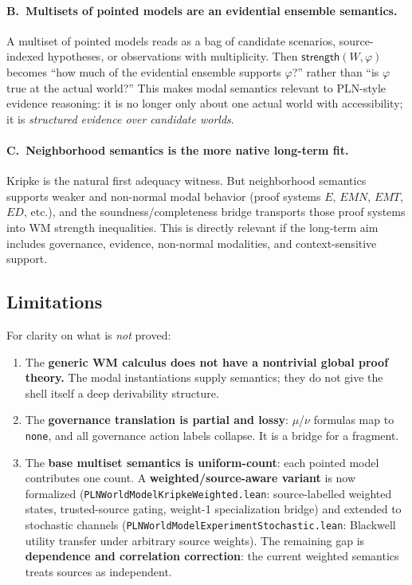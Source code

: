 \documentclass[]{article}
\newcommand{\code}[1]{\texttt{#1}}
\newcommand{\Strength}{\mathsf{strength}}
\begin{document}
\paragraph{B.\ Multisets of pointed models are an evidential ensemble
semantics.}
A multiset of pointed models reads as a bag of candidate scenarios,
source-indexed hypotheses, or observations with multiplicity. Then
$\Strength(W,\varphi)$ becomes ``how much of the evidential ensemble
supports $\varphi$?'' rather than ``is $\varphi$ true at the actual
world?'' This makes modal semantics relevant to PLN-style evidence
reasoning: it is no longer only about one actual world with
accessibility; it is \emph{structured evidence over candidate worlds}.

\paragraph{C.\ Neighborhood semantics is the more native long-term fit.}
Kripke is the natural first adequacy witness. But neighborhood semantics
supports weaker and non-normal modal behavior (proof systems $E$,
$\mathit{EMN}$, $\mathit{EMT}$, $\mathit{ED}$, etc.), and the
soundness/completeness bridge transports those proof systems into WM
strength inequalities. This is directly relevant if the long-term aim
includes governance, evidence, non-normal modalities, and
context-sensitive support.


\subsection{Limitations}
\label{sec:modal-limits}

For clarity on what is \emph{not} proved:

\begin{enumerate}[leftmargin=2em]
\item The \textbf{generic WM calculus does not have a nontrivial global
  proof theory.} The modal instantiations supply semantics; they do not
  give the shell itself a deep derivability structure.
\item The \textbf{governance translation is partial and lossy}: $\mu$/$\nu$
  formulas map to \code{none}, and all governance action labels collapse.
  It is a bridge for a fragment.
\item The \textbf{base multiset semantics is uniform-count}: each pointed
  model contributes one count.  A \textbf{weighted/source-aware variant}
  is now formalized (\code{PLNWorldModelKripkeWeighted.lean}:
  source-labelled weighted states, trusted-source gating, weight-1
  specialization bridge) and extended to stochastic channels
  (\code{PLNWorldModelExperimentStochastic.lean}: Blackwell utility
  transfer under arbitrary source weights).  The remaining gap is
  \textbf{dependence and correlation correction}: the current weighted
  semantics treats sources as independent.
\end{enumerate}
\end{document}
